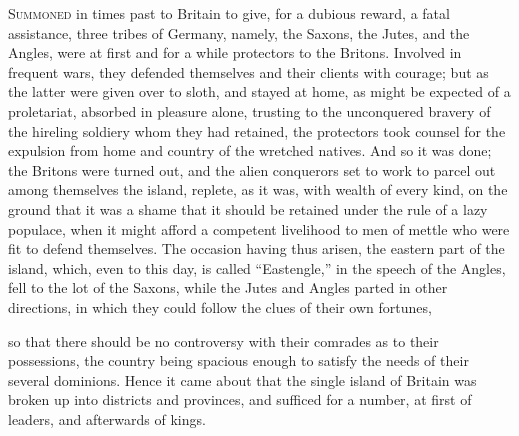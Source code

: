 \documentclass[10pt]{book}
\begin{document}
\begin{paracol}{2}
\lettrine[lines=4]{\color{BrickRed}S}{ummoned} in times past to Britain to give, for a dubious reward, a fatal assistance, three tribes of Germany, namely, the Saxons, the Jutes, and the Angles, were at first and for a while protectors to the Britons. Involved in frequent wars, they defended themselves and their clients with courage; but as the latter were given over to sloth, and stayed at home, as might be expected of a proletariat, absorbed in pleasure alone, trusting to the unconquered bravery of the hireling soldiery whom they had retained, the protectors took counsel for the expulsion from home and country of the wretched natives. And so it was done; the Britons were turned out, and the alien conquerors set to work to parcel out among themselves the island, replete, as it was, with wealth of every kind, on the ground that it was a shame that it should be retained under the rule of a lazy populace, when it might afford a competent livelihood to men of mettle who were fit to defend themselves. The occasion having thus arisen, the eastern part of the island, which, even to this day, is called ``Eastengle,'' in the speech of the Angles, fell to the lot of the Saxons, while the Jutes and Angles parted in other directions, in which they could follow the clues of their own fortunes,\linebreak{}

\end{paracol}

\vspace{-2\parskip}
\vspace{-3\lineskip}
so that there should be no controversy with their comrades as to their possessions, the country being spacious enough to satisfy the needs of their several dominions. Hence it came about that the single island of Britain was broken up into districts and provinces, and sufficed for a number, at first of leaders, and afterwards of kings.
\end{document}

